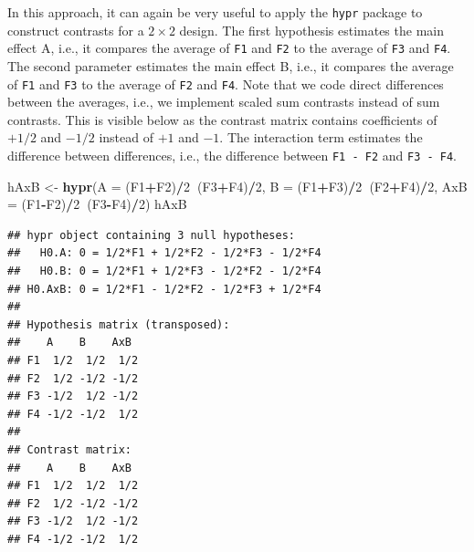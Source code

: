 \documentclass[12pt,]{krantz}
\newenvironment{Shaded}{\begin{snugshade}}{\end{snugshade}}
\newcommand{\KeywordTok}[1]{\textcolor[rgb]{0.13,0.29,0.53}{\textbf{#1}}}
\newcommand{\DataTypeTok}[1]{\textcolor[rgb]{0.13,0.29,0.53}{#1}}
\newcommand{\DecValTok}[1]{\textcolor[rgb]{0.00,0.00,0.81}{#1}}
\newcommand{\StringTok}[1]{\textcolor[rgb]{0.31,0.60,0.02}{#1}}
\newcommand{\OperatorTok}[1]{\textcolor[rgb]{0.81,0.36,0.00}{\textbf{#1}}}
\newcommand{\NormalTok}[1]{#1}
\theoremstyle{definition}
\theoremstyle{definition}
\theoremstyle{definition}
\theoremstyle{remark}
\begin{document}
In this approach, it can again be very useful to apply the \texttt{hypr}
package to construct contrasts for a \(2 \times 2\) design. The first
hypothesis estimates the main effect A, i.e., it compares the average of
\texttt{F1} and \texttt{F2} to the average of \texttt{F3} and
\texttt{F4}. The second parameter estimates the main effect B, i.e., it
compares the average of \texttt{F1} and \texttt{F3} to the average of
\texttt{F2} and \texttt{F4}. Note that we code direct differences
between the averages, i.e., we implement scaled sum contrasts instead of
sum contrasts. This is visible below as the contrast matrix contains
coefficients of \(+1/2\) and \(-1/2\) instead of \(+1\) and \(-1\). The
interaction term estimates the difference between differences, i.e., the
difference between \texttt{F1\ -\ F2} and \texttt{F3\ -\ F4}.

\begin{Shaded}
\begin{Highlighting}[]
\NormalTok{hAxB <-}\StringTok{ }\KeywordTok{hypr}\NormalTok{(}\DataTypeTok{A   =}\NormalTok{ (F1}\OperatorTok{+}\NormalTok{F2)}\OperatorTok{/}\DecValTok{2}\OperatorTok{~}\NormalTok{(F3}\OperatorTok{+}\NormalTok{F4)}\OperatorTok{/}\DecValTok{2}\NormalTok{,}
             \DataTypeTok{B   =}\NormalTok{ (F1}\OperatorTok{+}\NormalTok{F3)}\OperatorTok{/}\DecValTok{2}\OperatorTok{~}\NormalTok{(F2}\OperatorTok{+}\NormalTok{F4)}\OperatorTok{/}\DecValTok{2}\NormalTok{,}
             \DataTypeTok{AxB =}\NormalTok{ (F1}\OperatorTok{-}\NormalTok{F2)}\OperatorTok{/}\DecValTok{2}\OperatorTok{~}\NormalTok{(F3}\OperatorTok{-}\NormalTok{F4)}\OperatorTok{/}\DecValTok{2}\NormalTok{)}
\NormalTok{hAxB}
\end{Highlighting}
\end{Shaded}

\begin{verbatim}
## hypr object containing 3 null hypotheses:
##   H0.A: 0 = 1/2*F1 + 1/2*F2 - 1/2*F3 - 1/2*F4
##   H0.B: 0 = 1/2*F1 + 1/2*F3 - 1/2*F2 - 1/2*F4
## H0.AxB: 0 = 1/2*F1 - 1/2*F2 - 1/2*F3 + 1/2*F4
## 
## Hypothesis matrix (transposed):
##    A    B    AxB 
## F1  1/2  1/2  1/2
## F2  1/2 -1/2 -1/2
## F3 -1/2  1/2 -1/2
## F4 -1/2 -1/2  1/2
## 
## Contrast matrix:
##    A    B    AxB 
## F1  1/2  1/2  1/2
## F2  1/2 -1/2 -1/2
## F3 -1/2  1/2 -1/2
## F4 -1/2 -1/2  1/2
\end{verbatim}
\end{document}
